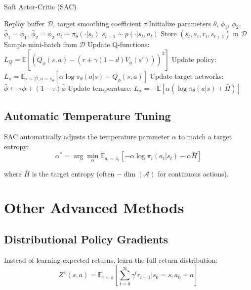 \begin{algorithm}
\caption{Soft Actor-Critic (SAC)}
\begin{algorithmic}
\REQUIRE Replay buffer $\mathcal{D}$, target smoothing coefficient $\tau$
\STATE Initialize parameters $\theta$, $\phi_1$, $\phi_2$, $\bar{\phi}_1 = \phi_1$, $\bar{\phi}_2 = \phi_2$
    \STATE $a_t \sim \pi_\theta(\cdot|s_t)$ 
    \STATE $s_{t+1} \sim p(\cdot|s_t, a_t)$ 
    \STATE Store $(s_t, a_t, r_t, s_{t+1})$ in $\mathcal{D}$
            \STATE Sample mini-batch from $\mathcal{D}$
            \STATE Update Q-functions:
            \STATE \quad $L_Q = \mathbb{E} [(Q_\phi(s,a) - (r + \gamma (1-d) V_{\bar{\phi}}(s')))^2]$
            \STATE Update policy:
            \STATE \quad $L_\pi = \mathbb{E}_{s \sim \mathcal{D}, a \sim \pi_\theta} [\alpha \log \pi_\theta(a|s) - Q_\phi(s,a)]$
            \STATE Update target networks: $\bar{\phi} \leftarrow \tau \phi + (1-\tau) \bar{\phi}$
            \STATE Update temperature: $L_\alpha = -\mathbb{E} [\alpha (\log \pi_\theta(a|s) + \bar{H})]$
        \ENDFOR
    \ENDIF
\ENDFOR
\end{algorithmic}
\end{algorithm}

\subsection{Automatic Temperature Tuning}

SAC automatically adjusts the temperature parameter $\alpha$ to match a target entropy:
\begin{equation}
\alpha^* = \arg\min_\alpha \mathbb{E}_{a_t \sim \pi_t} [-\alpha \log \pi_t(a_t|s_t) - \alpha \bar{H}]
\end{equation}

where $\bar{H}$ is the target entropy (often $-\dim(\mathcal{A})$ for continuous actions).

\section{Other Advanced Methods}

\subsection{Distributional Policy Gradients}

Instead of learning expected returns, learn the full return distribution:
\begin{equation}
Z^\pi(s,a) = \mathbb{E}_{\tau \sim \pi} \left[ \sum_{t=0}^\infty \gamma^t r_{t+1} \bigg| s_0=s, a_0=a \right]
\end{equation}

